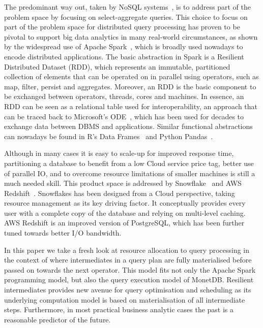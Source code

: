 \documentclass[conference]{IEEEtran}
\begin{document}
The predominant way out, taken by NoSQL systems~\cite{Casandra, Impala}, is to address part of the problem space by focusing on select-aggregate queries.
This choice to focus on part of the problem space for distributed query processing has proven to be pivotal to support big data analytics in many real-world circumstances, as shown by the widespread use of Apache Spark~\cite{Spark}, which is broadly used nowadays to encode distributed applications.
The basic abstraction in Spark is a Resilient Distributed Dataset (RDD), which represents an immutable, partitioned collection of elements that can be operated on in parallel using operators, such as map, filter, persist and aggregates.
Moreover, an RDD is the basic component to be exchanged between operators, threads, cores and machines.
In essence, an RDD can be seen as a relational table used for interoperability, an approach that can be traced back to Microsoft's ODE~\cite{MS_ODE}, which has been used for decades to exchange data between DBMS and applications.
Similar functional abstractions can nowadays be found in R's Data Frames~\cite{RDataFrame} and Python Pandas~\cite{Pandas}.


Although in many cases it is easy to scale-up for improved response time, partitioning a database to benefit from a low Cloud service price tag, better use of parallel IO, and to overcome resource limitations of smaller machines is still a much needed skill.
This product space is addressed by Snowflake~\cite{snowflake} and AWS Redshift~\cite{redshift}.
Snowflakes has been designed from a Cloud perspective, taking resource management as its key driving factor.
It conceptually provides every user with a complete copy of the database and relying on multi-level caching.
AWS Redshift is an improved version of PostgreSQL, which has been further tuned towards better I/O bandwidth.

In this paper we take a fresh look at resource allocation to query processing in the context of where intermediates in a query plan are fully materialised before passed on towards the next operator.
This model fits not only the Apache Spark programming model, but also the query execution model of MonetDB.
Resilient intermediates provides new avenue for query optimisation and scheduling as its underlying computation model is based on materialisation of all intermediate steps.
Furthermore, in most practical business analytic cases the past is a reasonable predictor of the future.
\end{document}
